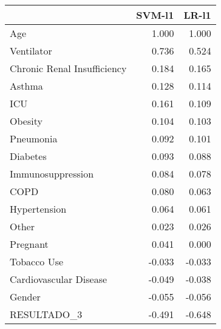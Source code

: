 \begin{tabular}{lrr}
\toprule
{} &  SVM-l1 &  LR-l1 \\
\midrule
Age                         &   1.000 &  1.000 \\
Ventilator                  &   0.736 &  0.524 \\
Chronic Renal Insufficiency &   0.184 &  0.165 \\
Asthma                      &   0.128 &  0.114 \\
ICU                         &   0.161 &  0.109 \\
Obesity                     &   0.104 &  0.103 \\
Pneumonia                   &   0.092 &  0.101 \\
Diabetes                    &   0.093 &  0.088 \\
Immunosuppression           &   0.084 &  0.078 \\
COPD                        &   0.080 &  0.063 \\
Hypertension                &   0.064 &  0.061 \\
Other                       &   0.023 &  0.026 \\
Pregnant                    &   0.041 &  0.000 \\
Tobacco Use                 &  -0.033 & -0.033 \\
Cardiovascular Disease      &  -0.049 & -0.038 \\
Gender                      &  -0.055 & -0.056 \\
RESULTADO\_3                 &  -0.491 & -0.648 \\
\bottomrule
\end{tabular}
